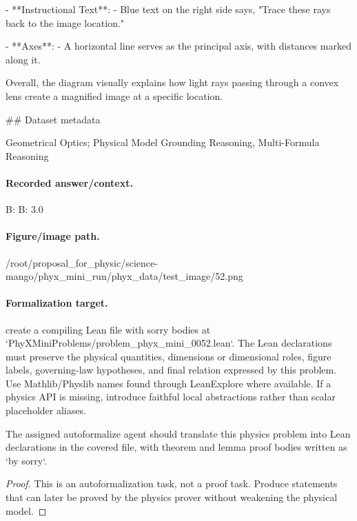 - **Instructional Text**:
  - Blue text on the right side says, "Trace these rays back to the image location."

- **Axes**:
  - A horizontal line serves as the principal axis, with distances marked along it.

Overall, the diagram visually explains how light rays passing through a convex lens create a magnified image at a specific location.

\#\# Dataset metadata

Geometrical Optics; Physical Model Grounding Reasoning, Multi-Formula Reasoning

\paragraph{Recorded answer/context.}
B: B: 3.0

\paragraph{Figure/image path.}
/root/proposal\_for\_physic/science-mango/phyx\_mini\_run/phyx\_data/test\_image/52.png

\paragraph{Formalization target.}
create a compiling Lean file with sorry bodies at `PhyXMiniProblems/problem\_phyx\_mini\_0052.lean`. The Lean declarations must preserve the physical quantities, dimensions or dimensional roles, figure labels, governing-law hypotheses, and final relation expressed by this problem.
Use Mathlib/Physlib names found through LeanExplore where available. If a physics API is missing, introduce faithful local abstractions rather than scalar placeholder aliases.

\begin{theorem}
\label{thm:physics:phyx_mini_0052:target}
The assigned autoformalize agent should translate this physics problem into Lean declarations in the covered file, with theorem and lemma proof bodies written as `by sorry`.
\end{theorem}
\begin{proof}
This is an autoformalization task, not a proof task. Produce statements that can later be proved by the physics prover without weakening the physical model.
\end{proof}

